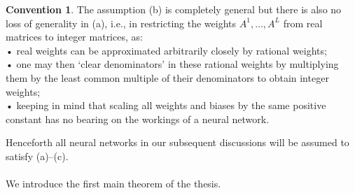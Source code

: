 \documentclass{article}
\theoremstyle{definition}
\newtheorem{convention}[theorem]{Convention}
\begin{document}
\begin{convention}\cite{zhang2018tropical}
The assumption (b) is completely general but there is also no loss of generality in (a), i.e., in restricting the weights $A^{1}, \dots ,A^{L}$
from real matrices to integer matrices, as: \\
• real weights can be approximated arbitrarily closely by
rational weights; \\
• one may then ‘clear denominators’ in these rational
weights by multiplying them by the least common multiple of their denominators to obtain integer weights; \\
• keeping in mind that scaling all weights and biases
by the same positive constant has no bearing on the
workings of a neural network.
\end{convention}

Henceforth all neural networks in our subsequent discussions will be assumed to satisfy (a)–(c). \\ \\
We introduce the first main theorem of the thesis.
\end{document}
